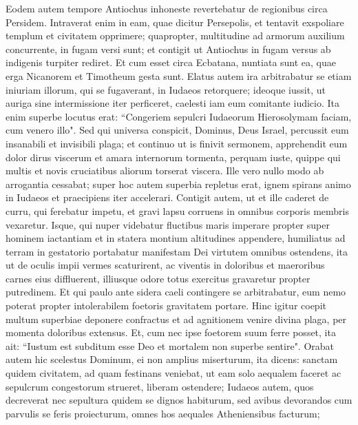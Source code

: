 \begin{biblechapter}  
\verse Eodem autem tempore Antiochus inhoneste revertebatur de regionibus circa Persidem. 
\verse Intraverat enim in eam, quae dicitur Persepolis, et tentavit exspoliare templum et civitatem opprimere; quapropter, multitudine ad armorum auxilium concurrente, in fugam versi sunt; et contigit ut Antiochus in fugam versus ab indigenis turpiter rediret. 
\verse Et cum esset circa Ecbatana, nuntiata sunt ea, quae erga Nicanorem et Timotheum gesta sunt. 
\verse Elatus autem ira arbitrabatur se etiam iniuriam illorum, qui se fugaverant, in Iudaeos retorquere; ideoque iussit, ut auriga sine intermissione iter perficeret, caelesti iam eum comitante iudicio. Ita enim superbe locutus erat: “Congeriem sepulcri Iudaeorum Hierosolymam faciam, cum venero illo". 
\verse Sed qui universa conspicit, Dominus, Deus Israel, percussit eum insanabili et invisibili plaga; et continuo ut is finivit sermonem, apprehendit eum dolor dirus viscerum et amara internorum tormenta, 
\verse perquam iuste, quippe qui multis et novis cruciatibus aliorum torserat viscera. 
\verse Ille vero nullo modo ab arrogantia cessabat; super hoc autem superbia repletus erat, ignem spirans animo in Iudaeos et praecipiens iter accelerari. Contigit autem, ut et ille caderet de curru, qui ferebatur impetu, et gravi lapsu corruens in omnibus corporis membris vexaretur. 
\verse Isque, qui nuper videbatur fluctibus maris imperare propter super hominem iactantiam et in statera montium altitudines appendere, humiliatus ad terram in gestatorio portabatur manifestam Dei virtutem omnibus ostendens, 
\verse ita ut de oculis impii vermes scaturirent, ac viventis in doloribus et maeroribus carnes eius diffluerent, illiusque odore totus exercitus gravaretur propter putredinem. 
\verse Et qui paulo ante sidera caeli contingere se arbitrabatur, eum nemo poterat propter intolerabilem foetoris gravitatem portare. 
\verse Hinc igitur coepit multum superbiae deponere confractus et ad agnitionem venire divina plaga, per momenta doloribus extensus. 
\verse Et, cum nec ipse foetorem suum ferre posset, ita ait: “Iustum est subditum esse Deo et mortalem non superbe sentire". 
\verse Orabat autem hic scelestus Dominum, ei non amplius miserturum, ita dicens: 
\verse sanctam quidem civitatem, ad quam festinans veniebat, ut eam solo aequalem faceret ac sepulcrum congestorum strueret, liberam ostendere; 
\verse Iudaeos autem, quos decreverat nec sepultura quidem se dignos habiturum, sed avibus devorandos cum parvulis se feris proiecturum, omnes hos aequales Atheniensibus facturum; 

\end{biblechapter}
